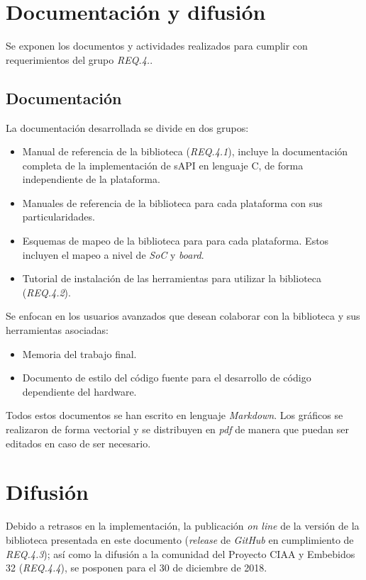 \newpage 
\section{Documentación y difusión}
\label{sec:documentation}

Se exponen los documentos y actividades realizados para cumplir con requerimientos del grupo \emph{REQ.4.}.

\subsection{Documentación}

La documentación desarrollada se divide en dos grupos:


\begin{itemize}
\item
Manual de referencia de la biblioteca (\emph{REQ.4.1}), incluye la documentación completa de la implementación de sAPI en lenguaje C, de forma independiente de la plataforma.
\item
Manuales de referencia de la biblioteca para cada plataforma con sus particularidades.
\item
Esquemas de mapeo de la biblioteca para para cada plataforma. Estos incluyen el mapeo a nivel de \emph{SoC} y \emph{board}.
\item
Tutorial de instalación de las herramientas para utilizar la biblioteca (\emph{REQ.4.2}).
\end{itemize}


Se enfocan en los usuarios avanzados que desean colaborar con la biblioteca y sus herramientas asociadas:

\begin{itemize}
\item
Memoria del trabajo final.
\item
Documento de estilo del código fuente para el desarrollo de código dependiente del hardware.
\end{itemize}

Todos estos documentos se han escrito en lenguaje \emph{Markdown}. Los gráficos se realizaron de forma vectorial y se distribuyen en \emph{pdf} de manera que puedan ser editados en caso de ser necesario. 

\section{Difusión}

Debido a retrasos en la implementación, la publicación \emph{on line} de la versión de la biblioteca presentada en este documento (\emph{release} de \emph{GitHub} en cumplimiento de \emph{REQ.4.3}); así como la difusión a la comunidad del Proyecto CIAA y Embebidos 32 (\emph{REQ.4.4}), se posponen para el 30 de diciembre de 2018.

